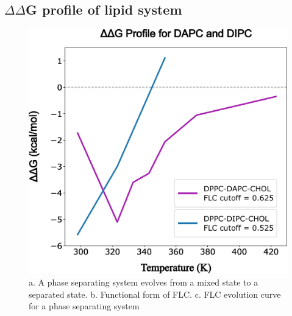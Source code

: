 \documentclass{biophys-new}
\begin{document}
\subsection*{$\Delta\Delta$G profile of lipid system}

\begin{figure}[hbt!]
\centering
\includegraphics[width=0.5\linewidth]{Figures/Main/7/placeholder.jpg}
\caption{a. A phase separating system evolves from a mixed state to a separated state. b. Functional form of FLC. c. FLC evolution curve for a phase separating system}
\label{figs7:view}
\end{figure}
\end{document}
